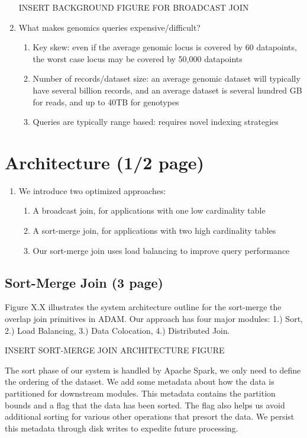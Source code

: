 \documentclass{vldb}
\begin{document}
\begin{enumerate}
INSERT BACKGROUND FIGURE FOR BROADCAST JOIN

\item What makes genomics queries expensive/difficult?
\begin{enumerate}
\item Key skew: even if the average genomic locus is covered by 60 datapoints,
the worst case locus may be covered by 50,000 datapoints~\cite{pinard06}
\item Number of records/dataset size: an average genomic dataset will typically have several
billion records, and an average dataset is several hundred GB for reads, and up to
40TB for genotypes
\item Queries are typically range based: requires novel indexing strategies
\end{enumerate}
\end{enumerate}

\section{Architecture  (1/2 page)}
\label{sec:architecture}
\begin{enumerate}
\item We introduce two optimized approaches:
\begin{enumerate}
\item A broadcast join, for applications with one low cardinality table
\item A sort-merge join, for applications with two high cardinality tables
\item Our sort-merge join uses load balancing to improve query performance
\end{enumerate}
\end{enumerate}

\subsection{Sort-Merge Join  (3 page)}
\label{sec:sort-merge}
Figure X.X illustrates the system architecture outline for the sort-merge the overlap 
join primitives in ADAM. Our approach has four major modules:  1.) Sort, 2.) 
Load Balancing, 3.) Data Colocation, 4.) Distributed Join. 

INSERT SORT-MERGE JOIN ARCHITECTURE FIGURE

The sort phase of our system is handled by Apache Spark, we only need to define the 
ordering of the dataset. We add some metadata about how the data is partitioned for 
downstream modules. This metadata contains the partition bounds and a flag that the 
data has been sorted. The flag also helps us avoid additional sorting for various other 
operations that presort the data. We persist this metadata through disk writes to expedite
future processing.
\end{document}
